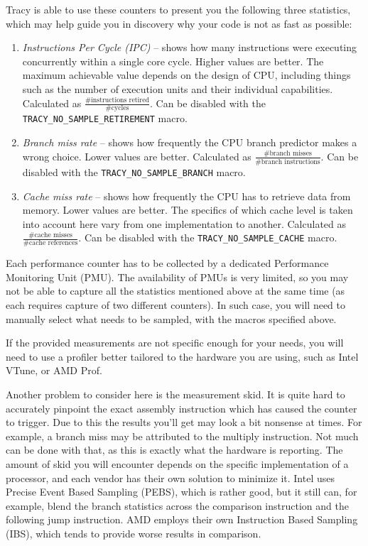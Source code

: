 \documentclass[hidelinks,titlepage,a4paper]{article}
\begin{document}
Tracy is able to use these counters to present you the following three statistics, which may help guide you in discovery why your code is not as fast as possible:

\begin{enumerate}
\item \emph{Instructions Per Cycle (IPC)} -- shows how many instructions were executing concurrently within a single core cycle. Higher values are better. The maximum achievable value depends on the design of CPU, including things such as the number of execution units and their individual capabilities. Calculated as $\frac{\text{\#instructions retired}}{\text{\#cycles}}$. Can be disabled with the \texttt{TRACY\_NO\_SAMPLE\_RETIREMENT} macro.
\item \emph{Branch miss rate} -- shows how frequently the CPU branch predictor makes a wrong choice. Lower values are better. Calculated as $\frac{\text{\#branch misses}}{\text{\#branch instructions}}$. Can be disabled with the \texttt{TRACY\_NO\_SAMPLE\_BRANCH} macro.
\item \emph{Cache miss rate} -- shows how frequently the CPU has to retrieve data from memory. Lower values are better. The specifics of which cache level is taken into account here vary from one implementation to another. Calculated as $\frac{\text{\#cache misses}}{\text{\#cache references}}$. Can be disabled with the \texttt{TRACY\_NO\_SAMPLE\_CACHE} macro.
\end{enumerate}

Each performance counter has to be collected by a dedicated Performance Monitoring Unit (PMU). The availability of PMUs is very limited, so you may not be able to capture all the statistics mentioned above at the same time (as each requires capture of two different counters). In such case, you will need to manually select what needs to be sampled, with the macros specified above.

If the provided measurements are not specific enough for your needs, you will need to use a profiler better tailored to the hardware you are using, such as Intel VTune, or AMD \si{\micro}Prof.

Another problem to consider here is the measurement skid. It is quite hard to accurately pinpoint the exact assembly instruction which has caused the counter to trigger. Due to this the results you'll get may look a bit nonsense at times. For example, a branch miss may be attributed to the multiply instruction. Not much can be done with that, as this is exactly what the hardware is reporting. The amount of skid you will encounter depends on the specific implementation of a processor, and each vendor has their own solution to minimize it. Intel uses Precise Event Based Sampling (PEBS), which is rather good, but it still can, for example, blend the branch statistics across the comparison instruction and the following jump instruction. AMD employs their own Instruction Based Sampling (IBS), which tends to provide worse results in comparison.
\end{document}
